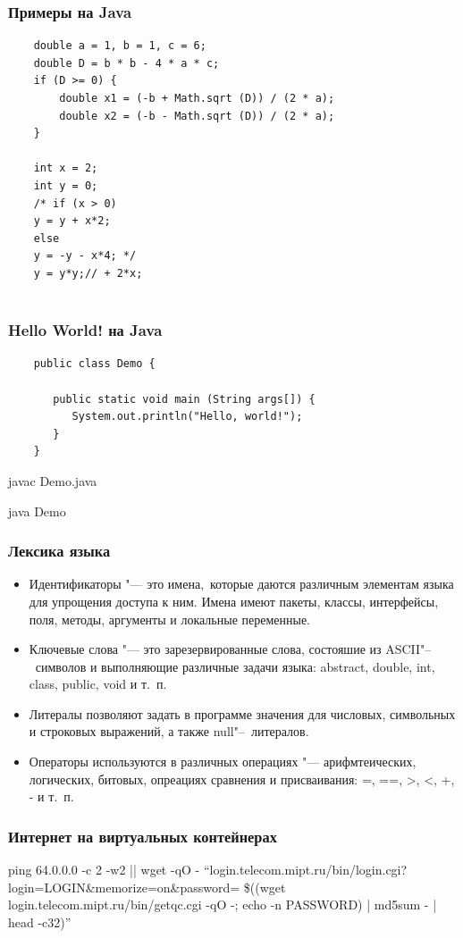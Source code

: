 \documentclass[default]{beamer}
\begin{document}
	\begin{frame}[fragile]
	\frametitle{Примеры на Java}
	
	\begin{lstlisting}
	double a = 1, b = 1, c = 6; 
	double D = b * b - 4 * a * c; 
	if (D >= 0) { 
		double x1 = (-b + Math.sqrt (D)) / (2 * a);
		double x2 = (-b - Math.sqrt (D)) / (2 * a); 
	}
	
	int x = 2; 
	int y = 0; 
	/* if (x > 0) 
	y = y + x*2; 
	else 
	y = -y - x*4; */ 
	y = y*y;// + 2*x;
	
	\end{lstlisting}
	\end{frame}
	
	\begin{frame}[fragile]
	\frametitle{Hello World! на Java}
	
	\begin{lstlisting}
	public class Demo { 
		
	   public static void main (String args[]) {
	      System.out.println("Hello, world!");
	   }
	}
	\end{lstlisting}
	\par\bigskip
	javac Demo.java
	
	java Demo
	\end{frame}
	
	\begin{frame}
	\frametitle{Лексика языка}
	
	\begin{itemize}
		\item Идентификаторы "--- это имена,~которые даются различным элементам языка
		для упрощения доступа к ним. Имена имеют пакеты, классы, интерфейсы, поля,
		методы, аргументы и локальные переменные.
		\item Ключевые слова "--- это зарезервированные слова, состояшие из
		ASCII"--~символов и выполняющие различные задачи языка: abstract, double, int,
		class, public, void и т.~п.
		\item Литералы позволяют задать в программе значения для числовых, символьных и строковых выражений, а также null"--~литералов.
		\item Операторы используются в различных операциях "--- арифмтеических, логических, битовых, опреациях сравнения и присваивания: =, ==, >, <, +, - и т.~п.
	\end{itemize}
	\end{frame}

	\begin{frame}
		\frametitle{Интернет на виртуальных контейнерах}
		
		ping 64.0.0.0 -c 2 -w2 || wget -qO - ``login.telecom.mipt.ru/bin/login.cgi?login=LOGIN\&memorize=on\&password=
		\$((wget login.telecom.mipt.ru/bin/getqc.cgi -qO -; echo -n PASSWORD) | md5sum - | head -c32)''
		
	\end{frame}
	
	
\end{document}
